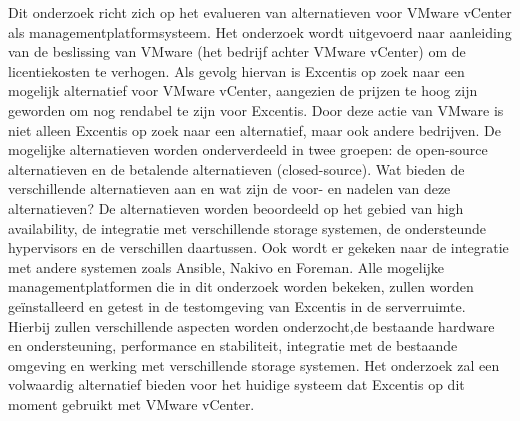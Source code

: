 Dit onderzoek richt zich op het evalueren van alternatieven voor VMware vCenter als managementplatformsysteem. Het onderzoek wordt uitgevoerd naar aanleiding van de beslissing van VMware (het bedrijf achter VMware vCenter) om de licentiekosten te verhogen. Als gevolg hiervan is Excentis op zoek naar een mogelijk alternatief voor VMware vCenter, aangezien de prijzen te hoog zijn geworden om nog rendabel te zijn voor Excentis. Door deze actie van VMware is niet alleen Excentis op zoek naar een alternatief, maar ook andere bedrijven.
De mogelijke alternatieven worden onderverdeeld in twee groepen: de open-source alternatieven en de betalende alternatieven (closed-source). Wat bieden de verschillende alternatieven aan en wat zijn de voor- en nadelen van deze alternatieven? De alternatieven worden beoordeeld op het gebied van high availability, de integratie met verschillende storage systemen, de ondersteunde hypervisors en de verschillen daartussen. Ook wordt er gekeken naar de integratie met andere systemen zoals Ansible, Nakivo en Foreman.
Alle mogelijke managementplatformen die in dit onderzoek worden bekeken, zullen worden geïnstalleerd en getest in de testomgeving van Excentis in de serverruimte. Hierbij zullen verschillende aspecten worden onderzocht,de bestaande hardware en ondersteuning, performance en stabiliteit, integratie met de bestaande omgeving en werking met verschillende storage systemen. Het onderzoek zal een volwaardig alternatief bieden voor het huidige systeem dat Excentis op dit moment gebruikt met VMware vCenter.